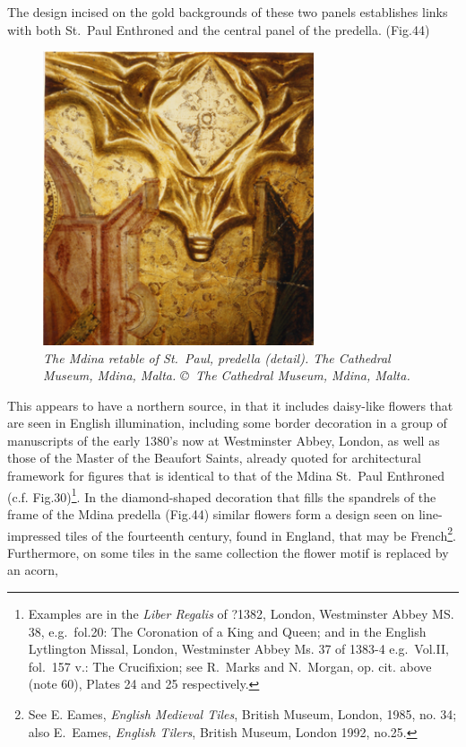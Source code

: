 \documentclass[a4paper,12pt]{article}
\begin{document}
The design incised on the gold backgrounds of these two panels
establishes links with both St.~Paul Enthroned and the central panel
of the predella. (Fig.44) 
\begin{figure}[htbp]
\centering
\includegraphics[width=8cm]{pics/fig44.png}
\caption[The Mdina retable of St.~Paul, predella (detail).]  
{\it The Mdina retable of St.~Paul, predella (detail).  
The Cathedral Museum, Mdina, Malta. \copyright\ The Cathedral Museum,
  Mdina, Malta.} 
\end{figure}
This appears to have a northern source, in
that it includes daisy-like flowers that are seen in English
illumination, including some border decoration in a group of
manuscripts of the early 1380's now at Westminster Abbey, London, as
well as those of the Master of the Beaufort Saints, already quoted for
architectural framework for figures that is identical to that of the
Mdina St.~Paul Enthroned (c.f. Fig.30)\footnote{Examples are in the
\textit{Liber Regalis} of ?1382, London, Westminster Abbey MS. 38,
e.g.~fol.20: The Coronation of a King and Queen; and in the English
Lytlington Missal, London, Westminster Abbey Ms. 37 of 1383-4
e.g.~Vol.II, fol.~157 v.: The Crucifixion; see R.~Marks and N.~Morgan,
op. cit. above (note 60), Plates 24 and 25 respectively.}. In the
diamond-shaped decoration that fills the spandrels of the frame of the
Mdina predella (Fig.44) similar flowers form a design seen on
line-impressed tiles of the fourteenth century, found in England, that
may be French\footnote{See E. Eames, \textit{English Medieval Tiles},
British Museum, London, 1985, no. 34; also E.~Eames, \textit{English
Tilers}, British Museum, London 1992, no.25.}. Furthermore, on some
tiles in the same collection the flower motif is replaced by an acorn,
\end{document}
